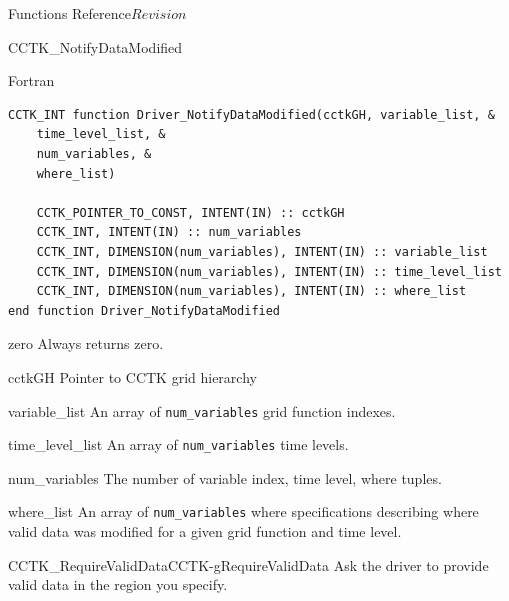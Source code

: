 \begin{cactuspart}{ Functions Reference}{}{$Revision$}
\begin{FunctionDescription}{CCTK\_NotifyDataModified}
\begin{SynopsisSection}
\begin{Synopsis}{Fortran}
\begin{verbatim}
CCTK_INT function Driver_NotifyDataModified(cctkGH, variable_list, &
    time_level_list, &
    num_variables, &
    where_list)

    CCTK_POINTER_TO_CONST, INTENT(IN) :: cctkGH
    CCTK_INT, INTENT(IN) :: num_variables
    CCTK_INT, DIMENSION(num_variables), INTENT(IN) :: variable_list
    CCTK_INT, DIMENSION(num_variables), INTENT(IN) :: time_level_list
    CCTK_INT, DIMENSION(num_variables), INTENT(IN) :: where_list
end function Driver_NotifyDataModified
\end{verbatim}
\end{Synopsis}
\end{SynopsisSection}

\begin{ResultSection}
\begin{Result}{zero}
Always returns zero.
\end{Result}
\end{ResultSection}

\begin{ParameterSection}
\begin{Parameter}{cctkGH}
Pointer to CCTK grid hierarchy
\end{Parameter}

\begin{Parameter}{variable\_list}
An array of \texttt{num\_variables} grid function indexes.
\end{Parameter}

\begin{Parameter}{time\_level\_list}
An array of \texttt{num\_variables} time levels.
\end{Parameter}

\begin{Parameter}{num\_variables}
The number of variable index, time level, where tuples.
\end{Parameter}

\begin{Parameter}{where\_list}
An array of \texttt{num\_variables} where specifications describing
where valid data was modified for a given grid function and time level.
\end{Parameter}
\end{ParameterSection}

\begin{SeeAlsoSection}
\begin{SeeAlso2}{CCTK\_RequireValidData}{CCTK-gRequireValidData}
Ask the driver to provide valid data in the region you specify.
\end{SeeAlso2}
\end{SeeAlsoSection}


\end{FunctionDescription}
\end{cactuspart}
